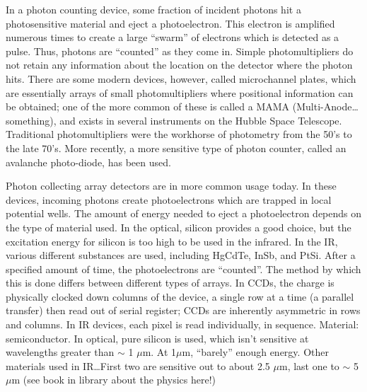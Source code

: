 \documentclass[12pt]{article}
\begin{document}
In a photon counting device, some fraction of incident photons hit a
photosensitive material and eject a photoelectron. This electron is
amplified numerous times to create a large ``swarm'' of electrons
which is detected as a pulse. Thus, photons are ``counted'' as they
come in. Simple photomultipliers do not retain any information about
the location on the detector where the photon hits. There are some
modern devices, however, called microchannel plates, which are
essentially arrays of small photomultipliers where positional
information can be obtained; one of the more common of these is called
a MAMA (Multi-Anode\ldots something),
and exists in several instruments on the Hubble Space
Telescope. Traditional photomultipliers were the workhorse of
photometry from the 50's to the late 70's. More recently, a more
sensitive type of photon counter, called an avalanche photo-diode, has
been used.

Photon collecting array detectors are in more common usage today. In
these devices, incoming photons create photoelectrons which are
trapped in local potential wells. The amount of energy needed to eject
a photoelectron depends on the type of material used. In the optical,
silicon provides a good choice, but the excitation energy for silicon
is too high to be used in the infrared. In the IR, various different
substances are used, including HgCdTe, InSb, and PtSi. After a
specified amount of time, the photoelectrons are ``counted''. The
method by which this is done differs between different types of
arrays. In CCDs, the charge is physically clocked down columns of the
device, a single row at a time (a parallel transfer) then read out of
serial register; CCDs are inherently asymmetric in rows and columns.
In IR devices, each pixel is read individually, in sequence.
\textcolor{myBlue}{Material: semiconductor. In optical, pure silicon
is used, which isn't sensitive at wavelengths greater than $\sim$
1 $\mu$m. At 1$\mu$m, ``barely'' enough energy. Other materials used
in IR\ldots First two are sensitive out to about 2.5 $\mu$m, last one
to $\sim$ 5 $\mu$m (see book in library about the physics here!)}
\end{document}

